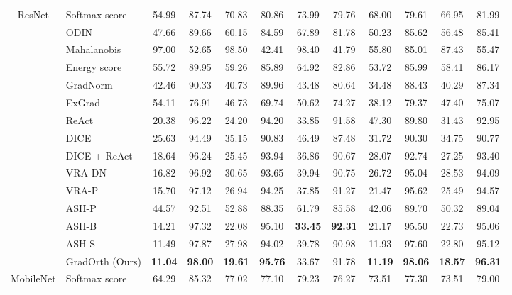 \documentclass{article}
\begin{document}
\begin{table}[hbt!]
{\begin{tabular}{|c| c| c| c| c| c| c| c| c| c| c| c|}
\multirow{10}{*}{ResNet} & \multicolumn{1}{l|}{Softmax score} & 54.99 & 87.74 & 70.83 & 80.86 & 73.99 & 79.76 & 68.00 & 79.61 & 66.95 & 81.99 \\
& \multicolumn{1}{l|}{ODIN} & 47.66 & 89.66 & 60.15 & 84.59 & 67.89 & 81.78 & 50.23 & 85.62 & 56.48 & 85.41 \\
& \multicolumn{1}{l|}{Mahalanobis} & 97.00 & 52.65 & 98.50 & 42.41 & 98.40 & 41.79 & 55.80 & 85.01 & 87.43 & 55.47 \\
& \multicolumn{1}{l|}{Energy score} & 55.72 & 89.95 & 59.26 & 85.89 & 64.92 & 82.86 & 53.72 & 85.99 & 58.41 & 86.17 \\
& \multicolumn{1}{l|}{GradNorm} & 42.46 & 90.33 & 40.73 & 89.96 & 43.48 & 80.64 & 34.48 & 88.43 & 40.29 & 87.34 \\
& \multicolumn{1}{l|}{ExGrad} & 54.11 & 76.91 & 46.73 & 69.74 & 50.62 & 74.27 & 38.12 & 79.37 &47.40&75.07  \\
& \multicolumn{1}{l|}{ReAct} & 20.38 & 96.22 & 24.20 & 94.20 & 33.85 & 91.58 & 47.30 & 89.80 & 31.43 & 92.95 \\
& \multicolumn{1}{l|}{DICE} & 25.63 & 94.49 & 35.15 & 90.83 & 46.49 &  87.48 & 31.72 & 90.30 & 34.75 & 90.77 \\
& \multicolumn{1}{l|}{DICE + ReAct} & 18.64 & 96.24 & 25.45 & 93.94 & 36.86 & 90.67 & 28.07 & 92.74 & 27.25 & 93.40 \\
& \multicolumn{1}{l|}{VRA-DN} &  16.82 & 96.92 &30.65&  93.65& 39.94  &90.75   &26.72 & 95.04&28.53 & 94.09\\
&\multicolumn{1}{l|}{VRA-P} &  15.70 & 97.12 &26.94 & 94.25& 37.85 & 91.27   & 21.47  &95.62&25.49 & 94.57\\
 & \multicolumn{1}{l|}{ASH-P } & 44.57 & 92.51 & 52.88 & 88.35 & 61.79 & 85.58 & 42.06 & 89.70 & 50.32 & 89.04 \\
 & \multicolumn{1}{l|}{ASH-B }  & 14.21 & 97.32 & 22.08 & 95.10 &\textbf{33.45} & \textbf{92.31} & 21.17 & 95.50 & 22.73 & 95.06 \\
 & \multicolumn{1}{l|}{ASH-S}  & 11.49 & 97.87 & 27.98 & 94.02 & 39.78 & 90.98 & 11.93 & 97.60 & 22.80 & 95.12 \\
 &\multicolumn{1}{l|}{GradOrth (Ours)}& \textbf{11.04}&\textbf{98.00}& \textbf{19.61}&\textbf{95.76}& 33.67 & 91.78 & \textbf{11.19} & \textbf{98.06} & \textbf{18.57} & \textbf{96.31}\\
\midrule
\multirow{10}{*}{MobileNet} & \multicolumn{1}{l|}{Softmax score} & 64.29 & 85.32 & 77.02 & 77.10 & 79.23 & 76.27 & 73.51 & 77.30 & 73.51 & 79.00 \\

\end{tabular}}
\end{table}
\end{document}
